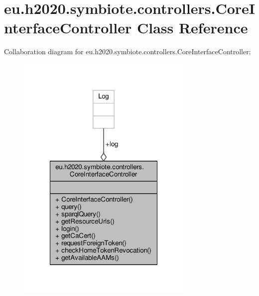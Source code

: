 \hypertarget{classeu_1_1h2020_1_1symbiote_1_1controllers_1_1CoreInterfaceController}{}\section{eu.\+h2020.\+symbiote.\+controllers.\+Core\+Interface\+Controller Class Reference}
\label{classeu_1_1h2020_1_1symbiote_1_1controllers_1_1CoreInterfaceController}


Collaboration diagram for eu.\+h2020.\+symbiote.\+controllers.\+Core\+Interface\+Controller\+:
\nopagebreak
\begin{figure}[H]
\begin{center}
\leavevmode
\includegraphics[width=240pt]{classeu_1_1h2020_1_1symbiote_1_1controllers_1_1CoreInterfaceController__coll__graph}
\end{center}
\end{figure}
